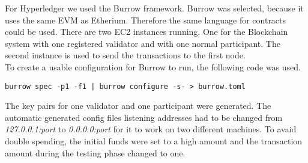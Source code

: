 For Hyperledger we used the Burrow framework. Burrow was selected, because it uses the same EVM as Etherium.
Therefore the same language for contracts could be used. There are two EC2 instances running. One for the Blockchain system
with one registered validator and with one normal participant. The second instance is used to send the
transactions to the first node. \\
To create a usable configuration for Burrow to run, the following code was used.
\begin{lstlisting}[frame=single]
    burrow spec -p1 -f1 | burrow configure -s- > burrow.toml
\end{lstlisting}
The key pairs for one validator and one participant were generated.
The automatic generated config files listening addresses had to be changed from \textit{127.0.0.1:port} to \textit{0.0.0.0:port}
for it to work on two different machines. To avaid double spending, the initial funds were set to a high amount and the transaction
amount during the testing phase changed to one.